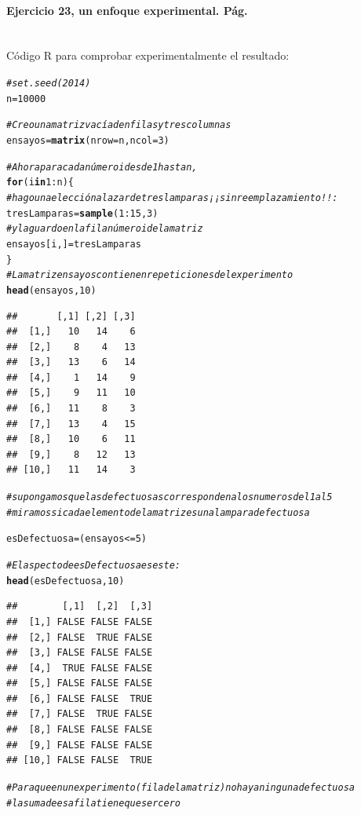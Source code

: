 \documentclass[10pt,a4paper]{article}\usepackage[]{graphicx}\usepackage[]{color}
\makeatletter
\newcommand{\hlnum}[1]{\textcolor[rgb]{0.686,0.059,0.569}{#1}}%
\newcommand{\hlcom}[1]{\textcolor[rgb]{0.678,0.584,0.686}{\textit{#1}}}%
\newcommand{\hlopt}[1]{\textcolor[rgb]{0,0,0}{#1}}%
\newcommand{\hlstd}[1]{\textcolor[rgb]{0.345,0.345,0.345}{#1}}%
\newcommand{\hlkwa}[1]{\textcolor[rgb]{0.161,0.373,0.58}{\textbf{#1}}}%
\newcommand{\hlkwb}[1]{\textcolor[rgb]{0.69,0.353,0.396}{#1}}%
\newcommand{\hlkwc}[1]{\textcolor[rgb]{0.333,0.667,0.333}{#1}}%
\newcommand{\hlkwd}[1]{\textcolor[rgb]{0.737,0.353,0.396}{\textbf{#1}}}%
\newenvironment{kframe}{%
 \def\at@end@of@kframe{}%
 \ifinner\ifhmode%
  \def\at@end@of@kframe{\end{minipage}}%
  \begin{minipage}{\columnwidth}%
 \fi\fi%
 \def\FrameCommand##1{\hskip\@totalleftmargin \hskip-\fboxsep
 \colorbox{shadecolor}{##1}\hskip-\fboxsep
     \hskip-\linewidth \hskip-\@totalleftmargin \hskip\columnwidth}%
 \MakeFramed {\advance\hsize-\width
   \@totalleftmargin\z@ \linewidth\hsize
   \@setminipage}}%
 {\par\unskip\endMakeFramed%
 \at@end@of@kframe}
\newenvironment{knitrout}{}{} %
\newcounter {cont01}
\makeatother
\begin{document}
\paragraph{Ejercicio 23, un enfoque experimental. Pág. \pageref{tut03:ejercicio22}}
\label{tut03:ejercicio22:sol}\quad\\
Código R para comprobar experimentalmente el resultado:
\begin{knitrout}
\color{fgcolor}\begin{kframe}
\begin{alltt}
\hlcom{#set.seed(2014)}
\hlstd{n} \hlkwb{=} \hlnum{10000}

\hlcom{# Creo una matriz vacía de n filas y tres columnas}
\hlstd{ensayos} \hlkwb{=} \hlkwd{matrix}\hlstd{(}\hlkwc{nrow} \hlstd{= n,} \hlkwc{ncol} \hlstd{=} \hlnum{3}\hlstd{)}

\hlcom{# Ahora para cada número i desde 1 hasta n,}
\hlkwa{for}\hlstd{(i} \hlkwa{in} \hlnum{1}\hlopt{:}\hlstd{n)\{}
\hlcom{# hago una elección al azar de tres lamparas ¡¡sin reemplazamiento!!:}
\hlstd{tresLamparas} \hlkwb{=} \hlkwd{sample}\hlstd{(}\hlnum{1}\hlopt{:}\hlnum{15}\hlstd{,} \hlnum{3}\hlstd{)}
\hlcom{# y la guardo en la fila número i de la matriz}
\hlstd{ensayos[i, ]} \hlkwb{=} \hlstd{tresLamparas}
\hlstd{\}}
\hlcom{# La matriz ensayos contiene n repeticiones del experimento}
\hlkwd{head}\hlstd{(ensayos,} \hlnum{10}\hlstd{)}
\end{alltt}
\begin{verbatim}
##       [,1] [,2] [,3]
##  [1,]   10   14    6
##  [2,]    8    4   13
##  [3,]   13    6   14
##  [4,]    1   14    9
##  [5,]    9   11   10
##  [6,]   11    8    3
##  [7,]   13    4   15
##  [8,]   10    6   11
##  [9,]    8   12   13
## [10,]   11   14    3
\end{verbatim}
\begin{alltt}
\hlcom{# supongamos que las defectuosas corresponden a los numeros del 1 al 5}
\hlcom{# miramos si cada elemento de la matriz es una lampara defectuosa}

\hlstd{esDefectuosa} \hlkwb{=} \hlstd{(ensayos}\hlopt{<=} \hlnum{5}\hlstd{)}

\hlcom{# El aspecto de esDefectuosa es este:}
\hlkwd{head}\hlstd{(esDefectuosa,} \hlnum{10}\hlstd{)}
\end{alltt}
\begin{verbatim}
##        [,1]  [,2]  [,3]
##  [1,] FALSE FALSE FALSE
##  [2,] FALSE  TRUE FALSE
##  [3,] FALSE FALSE FALSE
##  [4,]  TRUE FALSE FALSE
##  [5,] FALSE FALSE FALSE
##  [6,] FALSE FALSE  TRUE
##  [7,] FALSE  TRUE FALSE
##  [8,] FALSE FALSE FALSE
##  [9,] FALSE FALSE FALSE
## [10,] FALSE FALSE  TRUE
\end{verbatim}
\begin{alltt}
\hlcom{# Para que en un experimento (fila de la matriz) no haya ninguna defectuosa}
\hlcom{# la suma de esa fila tiene que ser cero}


\end{alltt}
\end{kframe}
\end{knitrout}
\end{document}
